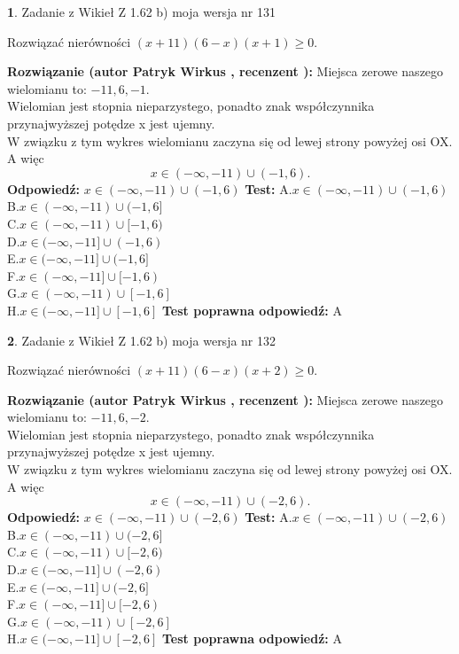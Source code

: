 \documentclass[12pt, a4paper]{article}
\theoremstyle{definition} %
\newtheorem{zad}{}
\newcommand{\zadStart}[1]{\begin{zad}#1\newline}
\newcommand{\zadStop}{\end{zad}}
\newcommand{\rozwStart}[2]{\noindent \textbf{Rozwiązanie (autor #1 , recenzent #2): }\newline}
\newcommand{\rozwStop}{\newline}
\newcommand{\odpStart}{\noindent \textbf{Odpowiedź:}\newline}
\newcommand{\odpStop}{\newline}
\newcommand{\testStart}{\noindent \textbf{Test:}\newline}
\newcommand{\testStop}{\newline}
\newcommand{\kluczStart}{\noindent \textbf{Test poprawna odpowiedź:}\newline}
\newcommand{\kluczStop}{\newline}
\begin{document}
\zadStart{Zadanie z Wikieł Z 1.62 b) moja wersja nr 131}

Rozwiązać nierówności $(x+11)(6-x)(x+1)\ge0$.
\zadStop
\rozwStart{Patryk Wirkus}{}
Miejsca zerowe naszego wielomianu to: $-11, 6, -1$.\\
Wielomian jest stopnia nieparzystego, ponadto znak współczynnika przy\linebreak najwyższej potędze x jest ujemny.\\ W związku z tym wykres wielomianu zaczyna się od lewej strony powyżej osi OX. A więc $$x \in (-\infty,-11) \cup (-1,6).$$
\rozwStop
\odpStart
$x \in (-\infty,-11) \cup (-1,6)$
\odpStop
\testStart
A.$x \in (-\infty,-11) \cup (-1,6)$\\
B.$x \in (-\infty,-11) \cup (-1,6]$\\
C.$x \in (-\infty,-11) \cup [-1,6)$\\
D.$x \in (-\infty,-11] \cup (-1,6)$\\
E.$x \in (-\infty,-11] \cup (-1,6]$\\
F.$x \in (-\infty,-11] \cup [-1,6)$\\
G.$x \in (-\infty,-11) \cup [-1,6]$\\
H.$x \in (-\infty,-11] \cup [-1,6]$
\testStop
\kluczStart
A
\kluczStop



\zadStart{Zadanie z Wikieł Z 1.62 b) moja wersja nr 132}

Rozwiązać nierówności $(x+11)(6-x)(x+2)\ge0$.
\zadStop
\rozwStart{Patryk Wirkus}{}
Miejsca zerowe naszego wielomianu to: $-11, 6, -2$.\\
Wielomian jest stopnia nieparzystego, ponadto znak współczynnika przy\linebreak najwyższej potędze x jest ujemny.\\ W związku z tym wykres wielomianu zaczyna się od lewej strony powyżej osi OX. A więc $$x \in (-\infty,-11) \cup (-2,6).$$
\rozwStop
\odpStart
$x \in (-\infty,-11) \cup (-2,6)$
\odpStop
\testStart
A.$x \in (-\infty,-11) \cup (-2,6)$\\
B.$x \in (-\infty,-11) \cup (-2,6]$\\
C.$x \in (-\infty,-11) \cup [-2,6)$\\
D.$x \in (-\infty,-11] \cup (-2,6)$\\
E.$x \in (-\infty,-11] \cup (-2,6]$\\
F.$x \in (-\infty,-11] \cup [-2,6)$\\
G.$x \in (-\infty,-11) \cup [-2,6]$\\
H.$x \in (-\infty,-11] \cup [-2,6]$
\testStop
\kluczStart
A
\kluczStop
\end{document}
